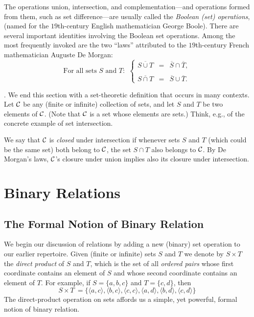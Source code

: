 The operations union, intersection, and complementation---and
operations formed from them, such as set difference---are usually
called the {\em Boolean (set)
operations},
(named for the $19$th-century English mathematician George Boole).
There are several important identities involving the Boolean set
operations.  Among the most frequently invoked are the two ``laws''
attributed to the $19$th-century French mathematician Auguste De
Morgan:
\begin{equation}
\label{e.de-morgan}
\mbox{For all sets $S$ and $T$: } \ \left\{
\begin{array}{lcl}
\overline{S \cup T} & = & \overline{S} \cap \overline{T}, \\
 \\
\overline{S \cap T} & = & \overline{S} \cup \overline{T}.
\end{array}
\right.
\end{equation}

.
%
We end this section with a set-theoretic definition that occurs in
many contexts.  Let $\cal C$ be any (finite or infinite) collection of
sets, and let $S$ and $T$ be two elements of $\cal C$.  (Note that
$\cal C$ is a set whose elements are sets.)  Think, e.g., of the
concrete example of set intersection.

We say that $\cal C$ is {\em closed} under intersection if whenever
sets $S$ and $T$ (which could be the same set) both belong to $\cal
C$, the set $S \cap T$ also belongs to $\mbox{$\cal C$}$.  By De Morgan's laws,
$\cal C$'s closure under union implies also its closure under
intersection.

\section{Binary Relations}
\label{s.relation}

\subsection{The Formal Notion of Binary Relation}
\label{s.relation-basic}

We begin our discussion of relations by adding a new (binary) set
operation to our earlier repertoire.  Given (finite or infinite) sets
$S$ and $T$ we denote by $S \times T$ the {\it
  direct product} of $S$ and $T$, which
is the set of all {\it ordered pairs} whose first coordinate contains an element of $S$ and
whose second coordinate contains an element of $T$.  For example, if
$S = \{a,b,c\}$ and $T = \{c,d\}$, then
\[ S \times T \ =  \{
\langle a,c \rangle,
\langle b,c \rangle,
\langle c,c \rangle,
\langle a,d \rangle,
\langle b,d \rangle,
\langle c,d \rangle\}
\]
The direct-product operation on sets affords us a simple, yet
powerful, formal notion of binary relation.

